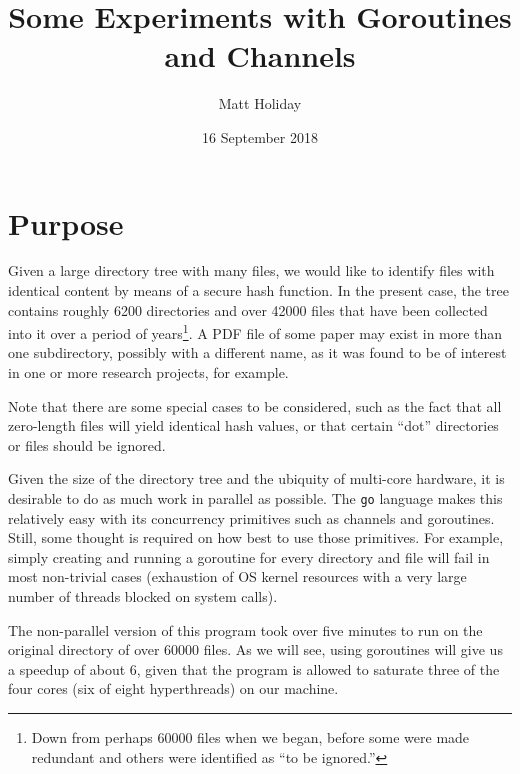\documentclass[12pt,notitlepage]{article}
\begin{document}
\title{Some Experiments with Goroutines and Channels}
\author{Matt Holiday}
\date{16 September 2018}
\maketitle
\thispagestyle{empty}

\section{Purpose}
Given a large directory tree with many files, we would like to identify files
with identical content by means of a secure hash function. In the present
case, the tree contains roughly 6200 directories and over 42000 files that
have been collected into it over a period of years\footnote{Down
from perhaps 60000 files when we began, before some were made redundant and
others were identified as ``to be ignored.''}.
A PDF file of some paper may exist in more than one subdirectory, possibly
with a different name, as it was found to be of interest in one or more
research projects, for example.

Note that there are some special cases to be considered, such as the fact
that all zero-length files will yield identical hash values, or that certain
``dot'' directories or files should be ignored.

Given the size of the directory tree and the ubiquity of multi-core hardware,
it is desirable to do as much work in parallel as possible. The \verb|go|
language makes this relatively easy with its concurrency primitives such as
channels and goroutines. Still, some thought is required on how best to use
those primitives. For example, simply creating and running a goroutine for
every directory and file will fail in most non-trivial cases (exhaustion
of OS kernel resources with a very large number of threads blocked on system
calls).

The non-parallel version of this program took over five minutes to run on the
original directory of over 60000 files. As we will see, using goroutines will
give us a speedup of about 6, given that the program is allowed to saturate
three of the four cores (six of eight hyperthreads) on our machine.
\end{document}
